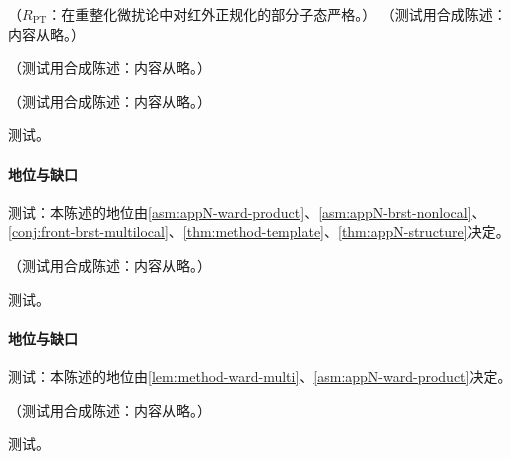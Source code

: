 \begin{proposition}\label{prop:method-ward-tree}
（$R_{\mathrm{PT}}$：在重整化微扰论中对红外正规化的部分子态严格。）
（测试用合成陈述：内容从略。）
\end{proposition}

\begin{example}\label{ex:method-ward-tree}
（测试用合成陈述：内容从略。）
\end{example}

\begin{lemma}\label{lem:method-ward-multi}
（测试用合成陈述：内容从略。）
\end{lemma}
\begin{proofsketch}测试。\end{proofsketch}
\paragraph{地位与缺口}测试：本陈述的地位由\cref{asm:appN-ward-product}、\cref{asm:appN-brst-nonlocal}、\cref{conj:front-brst-multilocal}、\cref{thm:method-template}、\cref{thm:appN-structure}决定。

\begin{proposition}\label{prop:method-collinear-wilson}
（测试用合成陈述：内容从略。）
\end{proposition}
\begin{proofsketch}测试。\end{proofsketch}
\paragraph{地位与缺口}测试：本陈述的地位由\cref{lem:method-ward-multi}、\cref{asm:appN-ward-product}决定。

\begin{proposition}\label{prop:method-soft-wilson}
（测试用合成陈述：内容从略。）
\end{proposition}
\begin{proofsketch}测试。\end{proofsketch}
